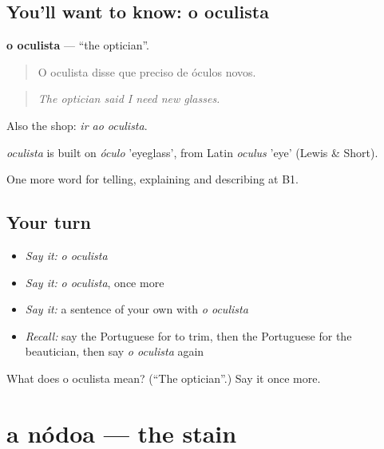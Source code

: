 \subsection*{You'll want to know: o oculista}
\textbf{o oculista} — \textquotedblleft{}the optician\textquotedblright{}.

\begin{quote}
O oculista disse que preciso de óculos novos.
\end{quote}

\begin{quote}
\emph{The optician said I need new glasses.}
\end{quote}

Also the shop: \emph{ir ao oculista}.

\begin{cousinweb}
\emph{oculista} is built on \emph{óculo} 'eyeglass', from Latin \emph{oculus} 'eye' (Lewis \& Short).
\end{cousinweb}

\begin{grammarlens}[title={What you've built}]
One more word for telling, explaining and describing at B1.
\end{grammarlens}

\subsection*{Your turn}
\begin{itemize}
\raggedright
  \item \emph{Say it:} \emph{o oculista}
  \item \emph{Say it:} \emph{o oculista}, once more
  \item \emph{Say it:} a sentence of your own with \emph{o oculista}
  \item \emph{Recall:} say the Portuguese for to trim, then the Portuguese for the beautician, then say \emph{o oculista} again
\end{itemize}

\begin{tcolorbox}[breakable,colback=teal!4,colframe=teal!35!black,title={Before you move on}]
What does o oculista mean? (\textquotedblleft{}The optician\textquotedblright{}.) Say it once more.
\end{tcolorbox}
\section[a nódoa]{a nódoa — the stain}

